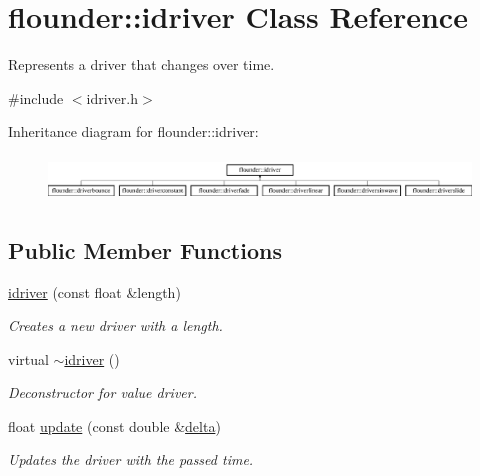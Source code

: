 \hypertarget{classflounder_1_1idriver}{}\section{flounder\+:\+:idriver Class Reference}
\label{classflounder_1_1idriver}


Represents a driver that changes over time.  




{\ttfamily \#include $<$idriver.\+h$>$}

Inheritance diagram for flounder\+:\+:idriver\+:\begin{figure}[H]
\begin{center}
\leavevmode
\includegraphics[height=1.212121cm]{classflounder_1_1idriver}
\end{center}
\end{figure}
\subsection*{Public Member Functions}
\begin{DoxyCompactItemize}
\item 
\hyperlink{classflounder_1_1idriver_a84bafd01e3984ededbb170a5efbad0f0}{idriver} (const float \&length)
\begin{DoxyCompactList}\small\item\em Creates a new driver with a length. \end{DoxyCompactList}\item 
virtual \hyperlink{classflounder_1_1idriver_a2a0111059b64474e6650b58d215defe0}{$\sim$idriver} ()
\begin{DoxyCompactList}\small\item\em Deconstructor for value driver. \end{DoxyCompactList}\item 
float \hyperlink{classflounder_1_1idriver_a1131c4e506fa5bfe3fae51b6636a09a9}{update} (const double \&\hyperlink{classflounder_1_1delta}{delta})
\begin{DoxyCompactList}\small\item\em Updates the driver with the passed time. \end{DoxyCompactList}\end{DoxyCompactItemize}
